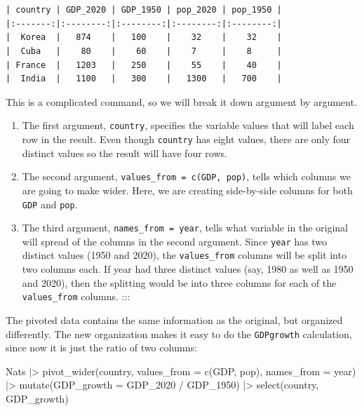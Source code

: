 \documentclass[
  letterpaper,
  DIV=11,
  numbers=noendperiod,
  oneside]{scrartcl}
\newenvironment{Shaded}{\begin{snugshade}}{\end{snugshade}}
\newcommand{\AttributeTok}[1]{\textcolor[rgb]{0.40,0.45,0.13}{#1}}
\newcommand{\FunctionTok}[1]{\textcolor[rgb]{0.28,0.35,0.67}{#1}}
\newcommand{\NormalTok}[1]{\textcolor[rgb]{0.00,0.23,0.31}{#1}}
\newcommand{\SpecialCharTok}[1]{\textcolor[rgb]{0.37,0.37,0.37}{#1}}
\begin{document}
\begin{verbatim}


| country | GDP_2020 | GDP_1950 | pop_2020 | pop_1950 |
|:-------:|:--------:|:--------:|:--------:|:--------:|
|  Korea  |   874    |   100    |    32    |    32    |
|  Cuba   |    80    |    60    |    7     |    8     |
| France  |   1203   |   250    |    55    |    40    |
|  India  |   1100   |   300    |   1300   |   700    |
\end{verbatim}

This is a complicated command, so we will break it down argument by
argument.

\begin{enumerate}
\def\labelenumi{\arabic{enumi}.}
\item
  The first argument, \texttt{country}, specifies the variable values
  that will label each row in the result. Even though \texttt{country}
  has eight values, there are only four distinct values so the result
  will have four rows.
\item
  The second argument, \texttt{values\_from\ =\ c(GDP,\ pop)}, tells
  which columns we are going to make wider. Here, we are creating
  side-by-side columns for both \texttt{GDP} and \texttt{pop}.
\item
  The third argument, \texttt{names\_from\ =\ year}, tells what variable
  in the original will spread of the columns in the second argument.
  Since \texttt{year} has two distinct values (1950 and 2020), the
  \texttt{values\_from} columns will be split into two columns each. If
  year had three distinct values (say, 1980 as well as 1950 and 2020),
  then the splitting would be into three columns for each of the
  \texttt{values\_from} columns. :::
\end{enumerate}

The pivoted data contains the same information as the original, but
organized differently. The new organization makes it easy to do the
\texttt{GDPgrowth} calculation, since now it is just the ratio of two
columns:

\begin{Shaded}
\begin{Highlighting}[]
\NormalTok{Nats }\SpecialCharTok{|\textgreater{}} 
  \FunctionTok{pivot\_wider}\NormalTok{(country, }\AttributeTok{values\_from =} \FunctionTok{c}\NormalTok{(GDP, pop), }\AttributeTok{names\_from =}\NormalTok{ year) }\SpecialCharTok{|\textgreater{}}
  \FunctionTok{mutate}\NormalTok{(}\AttributeTok{GDP\_growth =}\NormalTok{ GDP\_2020 }\SpecialCharTok{/}\NormalTok{ GDP\_1950) }\SpecialCharTok{|\textgreater{}}
  \FunctionTok{select}\NormalTok{(country, GDP\_growth)}
\end{Highlighting}
\end{Shaded}
\end{document}
